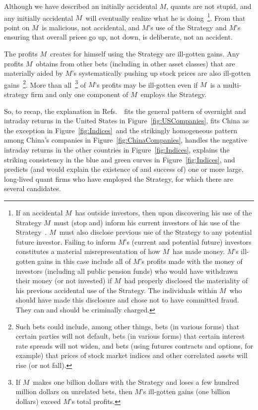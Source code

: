\documentclass[twocolumn,twoside,prd,floatfix,letterpaper]{revtex4}
\def \FigIndices {Figure~\ref{fig:Indices}}
\def \FigUSCompanies {Figure~\ref{fig:USCompanies}}
\def \FigChinaCompanies {Figure~\ref{fig:ChinaCompanies}}
\def \theExplanation {\cite{knuteson2016,knuteson2018,knuteson2019}}
\def \RefsTheExplanation {Refs.~\theExplanation}
\def \M {\ensuremath{M}}
\begin{document}
Although we have described an initially accidental \M, quants are not stupid, and any initially accidental \M\ will eventually realize what he is doing~\footnote{If an accidental \M\ has outside investors, then upon discovering his use of the Strategy \M\ must (stop and) inform his current investors of his use of the Strategy~\cite{knuteson2018}.  \M\ must also disclose previous use of the Strategy to any potential future investor.  Failing to inform \M's (current and potential future) investors constitutes a material misrepresentation of how \M\ has made money.  \M's ill-gotten gains in this case include all of \M's profits made with the money of investors (including all public pension funds) who would have withdrawn their money (or not invested) if \M\ had properly disclosed the materiality of his previous accidental use of the Strategy.  The individuals within \M\ who should have made this disclosure and chose not to have committed fraud.  They can and should be criminally charged.}.  From that point on \M\ is malicious, not accidental, and \M's use of the Strategy and \M's ensuring that overall prices go up, not down, is deliberate, not an accident.

The profits \M\ creates for himself using the Strategy are ill-gotten gains.  Any profits \M\ obtains from other bets (including in other asset classes) that are materially aided by \M's systematically pushing up stock prices are also ill-gotten gains~\footnote{Such bets could include, among other things, bets (in various forms) that certain parties will not default, bets (in various forms) that certain interest rate spreads will not widen, and bets (using futures contracts and options, for example) that prices of stock market indices and other correlated assets will rise (or not fall).}.  More than all~\footnote{If \M\ makes one billion dollars with the Strategy and loses a few hundred million dollars on unrelated bets, then \M's ill-gotten gains (one billion dollars) exceed \M's total profits.} of \M's profits may be ill-gotten even if \M\ is a multi-strategy firm and only one component of \M\ employs the Strategy.

So, to recap, the explanation in \RefsTheExplanation\ fits the general pattern of overnight and intraday returns in the United States in \FigUSCompanies, fits China as the exception in \FigIndices\ and the strikingly homogeneous pattern among China's companies in \FigChinaCompanies, handles the negative intraday returns in the other countries in \FigIndices, explains the striking consistency in the blue and green curves in \FigIndices, and predicts (and would explain the existence of and success of) one or more large, long-lived quant firms who have employed the Strategy, for which there are several candidates.
\end{document}
